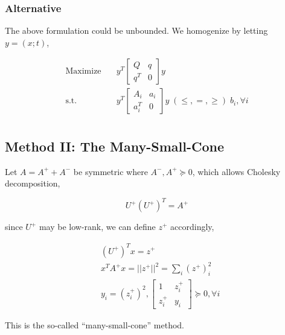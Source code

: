 \documentclass[../main]{subfiles}
\begin{document}
\subsubsection*{Alternative}
The above formulation could be unbounded. We homogenize by letting \(y = (x; t)\),

\begin{equation}
  \begin{aligned}
    \mathrm{Maximize}\quad & y^T
    \begin{bmatrix} Q   & q \\ q^T & 0 \end{bmatrix}y                                                                    \\
    \mathrm{s.t.} \quad    & y^T  \begin{bmatrix} A_i   & a_i \\ a_i^T & 0 \end{bmatrix}y  \; (\le, =, \ge) \; b_i, \forall i \\
  \end{aligned}
\end{equation}



\subsection{Method II: The Many-Small-Cone}\label{sdp-method-2}
Let \(A = A^+ + A^-\) be symmetric where \(A^-, A^+ \succeq 0\), which allows Cholesky decomposition,

\[U^+ (U^+)^T = A^+\]

since $U^+$ may be low-rank, we can define $z^+$ accordingly,

\begin{equation}
  \begin{aligned}
     & (U^+)^T x = z^+                                                  \\
     & x^TA^+ x = ||z^+||^2 = \sum_i (z^+)_i^2                          \\
     & y_i = (z^+_i)^2, \begin{bmatrix} 1 & z^+_i \\ z^+_i & y_i \end{bmatrix} \succeq 0, \forall i
  \end{aligned}
\end{equation}

This is the so-called ``many-small-cone'' method.
\end{document}

